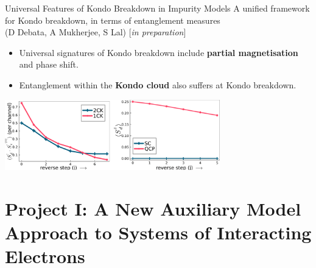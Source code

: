 \documentclass[11pt,aspectratio=169]{beamer}
\newcommand\focus[1]{%
	{\alert{\textbf{#1}}}
}
\begin{document}
\begin{frame}{Universal Features of Kondo Breakdown in Impurity Models}
\flushleft
A unified framework for Kondo breakdown, in terms of entanglement measures\\
(D Debata, A Mukherjee, S Lal) [{\it in preparation}]\\[10pt]

\begin{itemize}
	\item Universal signatures of Kondo breakdown include \focus{partial magnetisation} and phase shift.
	\item Entanglement within the \focus{Kondo cloud} also suffers at Kondo breakdown.
\end{itemize}

\vspace*{\fill}
\centering
\includegraphics[width=0.7\textwidth]{compensation.pdf}
\end{frame}
	
\section{Project I: A New Auxiliary Model Approach to Systems of Interacting Electrons}
\end{document}
